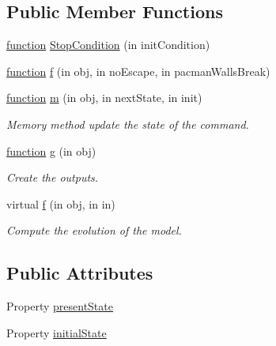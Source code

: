 \subsection*{Public Member Functions}
\begin{DoxyCompactItemize}
\item 
\hyperlink{_plan__desuma_functions_8m_ac2ffb26d6f42d3bbcd7847b0873403f4}{function} \hyperlink{class_stop_condition_a998151731b2f85cb0f3e0cbc7d82bf96}{Stop\+Condition} (in init\+Condition)
\item 
\hyperlink{_plan__desuma_functions_8m_ac2ffb26d6f42d3bbcd7847b0873403f4}{function} \hyperlink{class_stop_condition_abcffcbb16870f569058af2fd7823c5dd}{f} (in obj, in no\+Escape, in pacman\+Walls\+Break)
\item 
\hyperlink{_plan__desuma_functions_8m_ac2ffb26d6f42d3bbcd7847b0873403f4}{function} \hyperlink{class_stop_condition_a3140f24c6c4b80037b7d4f521c6ae2d3}{m} (in obj, in next\+State, in init)
\begin{DoxyCompactList}\small\item\em Memory method update the state of the command. \end{DoxyCompactList}\item 
\hyperlink{_plan__desuma_functions_8m_ac2ffb26d6f42d3bbcd7847b0873403f4}{function} \hyperlink{class_stop_condition_a07dadfabe92bf9a144b8a862720e7746}{g} (in obj)
\begin{DoxyCompactList}\small\item\em Create the outputs. \end{DoxyCompactList}\item 
virtual \hyperlink{class_model_s_e_d_ac36f9451c43b120828af4380858f2024}{f} (in obj, in in)
\begin{DoxyCompactList}\small\item\em Compute the evolution of the model. \end{DoxyCompactList}\end{DoxyCompactItemize}
\subsection*{Public Attributes}
\begin{DoxyCompactItemize}
\item 
Property \hyperlink{class_stop_condition_a9624cc7c421a50fa5086b0ebd0cd5fe3}{present\+State}
\item 
Property \hyperlink{class_stop_condition_acd9263acfa96c9138afdf497e55acc24}{initial\+State}
\end{DoxyCompactItemize}


